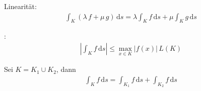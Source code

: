 
\begin{notice}
  \begin{enum-arab}
    \item Linearität:
    \begin{align*}
      \int_K (\lambda \, f + \mu \, g) \, \mathrm{d}s = \lambda \int_K f \, \mathrm{d}s + \mu \int_K g \, \mathrm{d}s
    \end{align*}
    
    \item {}:
    \begin{align*}
      \left| \int_K f \, \mathrm{d}s \right| \leq \max\limits_{x \in K} |f(x)| \, L(K)
    \end{align*}
    
    \item Sei $K = K_1 \cup K_2$, dann
    \begin{align*}
      \int_K f \, \mathrm{d}s = \int_{K_1} f \, \mathrm{d}s + \int_{K_2} f \, \mathrm{d}s
    \end{align*}
  \end{enum-arab}
\end{notice}

